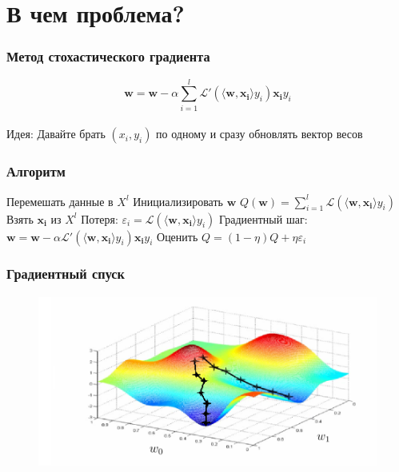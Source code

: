 \documentclass[10pt]{beamer}
\begin{document}
\section{В чем проблема?}

\begin{frame}\frametitle{Метод стохастического градиента}
	$$\mathbf{w} =  \mathbf{w} - \alpha \sum\limits_{i=1}^l \mathcal{L}'(\langle \mathbf{w}, \mathbf{x_i}\rangle y_i)\mathbf{x_i}y_i$$\\
	\bigbreak \pause
	\alert{Идея}: Давайте брать $(x_i, y_i)$ по одному и сразу обновлять вектор весов
\end{frame}

\begin{frame}\frametitle{Алгоритм}
  \begin{algorithmic}[1]
     \State Перемешать данные в $X^l$
     \State Инициализировать $\mathbf{w}$ 
     \State ${Q}(\mathbf{w}) = \sum\limits_{i=1}^l \mathcal{L}(\langle \mathbf{w}, \mathbf{x_i} \rangle y_i)$
       \State Взять $\mathbf{x_i}$ из $X^l$
       \State Потеря: $\varepsilon_i = \mathcal{L}(\langle \mathbf{w}, \mathbf{x_i} \rangle y_i)$
       \State Градиентный шаг: $\mathbf{w} =  \mathbf{w} - \alpha \mathcal{L}'(\langle \mathbf{w}, \mathbf{x_i}\rangle y_i)\mathbf{x_i}y_i$
       \State Оценить $Q = (1-\eta)Q + \eta \varepsilon_i$
     \EndRepeat
    \EndFunction
  \end{algorithmic}
\end{frame}

\begin{frame}\frametitle{Градиентный спуск}
	\begin{figure}[htbp]
	  \includegraphics[height=160pt, keepaspectratio = true]{images/gradient_descent2}
	\end{figure}
\end{frame}
\end{document}
